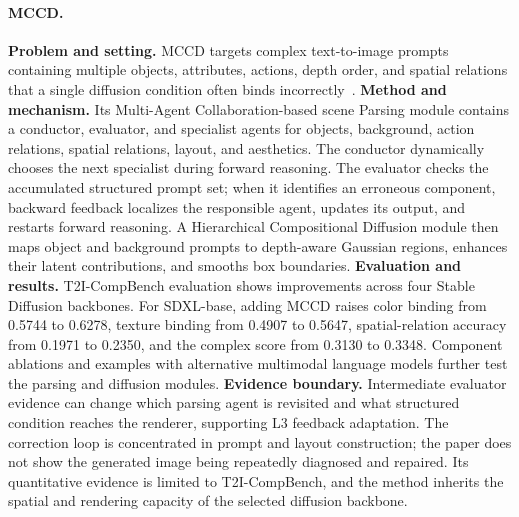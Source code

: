 \paragraph{MCCD.}
\textbf{Problem and setting.} MCCD targets complex text-to-image prompts containing multiple objects, attributes, actions, depth order, and spatial relations that a single diffusion condition often binds incorrectly~\cite{avg250502648}. \textbf{Method and mechanism.} Its Multi-Agent Collaboration-based scene Parsing module contains a conductor, evaluator, and specialist agents for objects, background, action relations, spatial relations, layout, and aesthetics. The conductor dynamically chooses the next specialist during forward reasoning. The evaluator checks the accumulated structured prompt set; when it identifies an erroneous component, backward feedback localizes the responsible agent, updates its output, and restarts forward reasoning. A Hierarchical Compositional Diffusion module then maps object and background prompts to depth-aware Gaussian regions, enhances their latent contributions, and smooths box boundaries. \textbf{Evaluation and results.} T2I-CompBench evaluation shows improvements across four Stable Diffusion backbones. For SDXL-base, adding MCCD raises color binding from 0.5744 to 0.6278, texture binding from 0.4907 to 0.5647, spatial-relation accuracy from 0.1971 to 0.2350, and the complex score from 0.3130 to 0.3348. Component ablations and examples with alternative multimodal language models further test the parsing and diffusion modules. \textbf{Evidence boundary.} Intermediate evaluator evidence can change which parsing agent is revisited and what structured condition reaches the renderer, supporting L3 feedback adaptation. The correction loop is concentrated in prompt and layout construction; the paper does not show the generated image being repeatedly diagnosed and repaired. Its quantitative evidence is limited to T2I-CompBench, and the method inherits the spatial and rendering capacity of the selected diffusion backbone.

